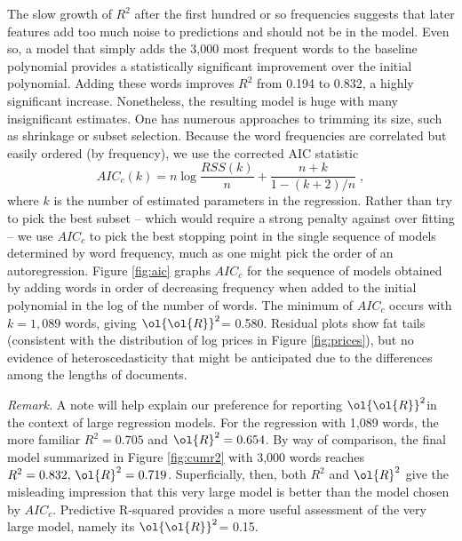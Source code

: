 \documentclass[12pt]{article}
\newcommand{\prs}{\mbox{$\ol{\ol{R}}^2$}}
\begin{document}
The slow growth of $R^2$ after the first hundred or so frequencies suggests that later features add too much noise to predictions and should not be in the model.  Even so, a model that simply adds the 3,000 most frequent words to the baseline polynomial provides a statistically significant improvement over the initial polynomial. Adding these words improves $R^2$ from 0.194 to 0.832, a highly significant increase.  Nonetheless, the resulting model is huge with many insignificant estimates.  One has numerous approaches to trimming its size, such as shrinkage or subset selection.  Because the word frequencies are correlated but easily ordered (by frequency), we use the corrected AIC statistic \citep{hurvich89}
\begin{equation}
    AIC_{c}(k) = n \log \frac{RSS(k)}{n} + \frac{n+k}{1-(k+2)/n} \;,
\end{equation}
where $k$ is the number of estimated parameters in the regression.  Rather than try to pick the best subset -- which would require a strong penalty against over fitting -- we use $AIC_c$ to pick the best stopping point in the single sequence of models determined by word frequency, much as one might pick the order of an autoregression.  Figure \ref{fig:aic} graphs $AIC_c$ for the sequence of models obtained by adding words in order of decreasing frequency when added to the initial polynomial in the log of the number of words.   The minimum of $AIC_c$ occurs with $k=1,089$ words, giving \prs = 0.580.   Residual plots show fat tails (consistent with the distribution of log prices in Figure \ref{fig:prices}), but no evidence of heteroscedasticity
 that might be anticipated due to the differences among the lengths of documents.

\noindent
{\it Remark.}  A note will help explain our preference for reporting \prs in the context of large regression models.   For the regression with 1,089 words, the more familiar $R^2 =  0.705$ and $\ol{R}^2=0.654$.  By way of comparison, the final model summarized in Figure \ref{fig:cumr2} with 3,000 words reaches $R^2 =  0.832, \, \ol{R}^2  = 0.719$.  Superficially, then, both $R^2$ and $\ol{R}^2$ give the misleading impression that this very large model is better than the model chosen by $AIC_c$.  Predictive R-squared provides a more useful assessment of the very large model, namely its \prs = 0.15.
\end{document}

